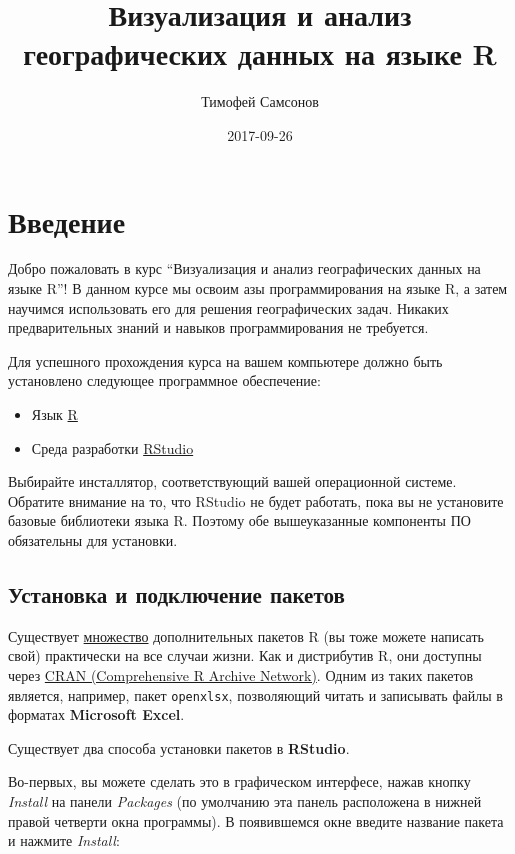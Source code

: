 \documentclass[]{book}
\title{Визуализация и анализ географических данных на языке R}
\author{Тимофей Самсонов}
\date{2017-09-26}
\providecommand{\tightlist}{%
  \setlength{\itemsep}{0pt}\setlength{\parskip}{0pt}}
\begin{document}
\maketitle

{
\setcounter{tocdepth}{1}
\tableofcontents
}
\chapter*{Введение}

Добро пожаловать в курс ``Визуализация и анализ географических данных на
языке R''! В данном курсе мы освоим азы программирования на языке R, а
затем научимся использовать его для решения географических задач.
Никаких предварительных знаний и навыков программирования не требуется.

Для успешного прохождения курса на вашем компьютере должно быть
установлено следующее программное обеспечение:

\begin{itemize}
\tightlist
\item
  Язык \href{https://cran.r-project.org}{R}
\item
  Среда разработки
  \href{https://www.rstudio.com/products/rstudio/download3/}{RStudio}
\end{itemize}

Выбирайте инсталлятор, соответствующий вашей операционной системе.
Обратите внимание на то, что RStudio не будет работать, пока вы не
установите базовые библиотеки языка R. Поэтому обе вышеуказанные
компоненты ПО обязательны для установки.

\section*{Установка и подключение пакетов}\label{---}

Существует \href{https://cran.r-project.org/web/packages/}{множество}
дополнительных пакетов R (вы тоже можете написать свой) практически на
все случаи жизни. Как и дистрибутив R, они доступны через
\href{https://cran.r-project.org}{CRAN (Comprehensive R Archive
Network)}. Одним из таких пакетов является, например, пакет
\texttt{openxlsx}, позволяющий читать и записывать файлы в форматах
\textbf{Microsoft Excel}.

Существует два способа установки пакетов в \textbf{RStudio}.

Во-первых, вы можете сделать это в графическом интерфесе, нажав кнопку
\emph{Install} на панели \emph{Packages} (по умолчанию эта панель
расположена в нижней правой четверти окна программы). В появившемся окне
введите название пакета и нажмите \emph{Install}:
\end{document}
